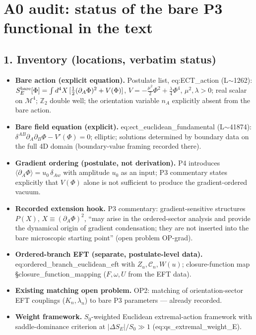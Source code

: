 \section*{A0 audit: status of the bare P3 functional in the text}

\subsection*{1. Inventory (locations, verbatim status)}
\begin{itemize}
\item \textbf{Bare action (explicit equation).}
  Postulate list, eq:ECT\_action (L$\sim$1262):
  $S_E^{\rm bare}[\Phi]=\int d^4X\,[\tfrac12(\partial_A\Phi)^2
  +V(\Phi)]$, $V=-\tfrac{\mu^2}{2}\Phi^2+\tfrac{\lambda}{4}\Phi^4$,
  $\mu^2,\lambda>0$; real scalar on $\mathcal M^4$; $\mathbb Z_2$
  double well; the orientation variable $n_A$ explicitly absent
  from the bare action.
\item \textbf{Bare field equation (explicit).}
  eq:ect\_euclidean\_fundamental (L$\sim$41874):
  $\delta^{AB}\partial_A\partial_B\Phi-V'(\Phi)=0$; elliptic;
  solutions determined by boundary data on the full 4D domain
  (boundary-value framing recorded there).
\item \textbf{Gradient ordering (postulate, not derivation).}
  P4 introduces $\langle\partial_A\Phi\rangle=u_0\,\delta_{Aw}$ with
  amplitude $u_0$ as an input; P3 commentary states explicitly that
  $V(\Phi)$ alone is not sufficient to produce the gradient-ordered
  vacuum.
\item \textbf{Recorded extension hook.}
  P3 commentary: gradient-sensitive structures $P(X)$,
  $X\equiv(\partial_A\Phi)^2$, ``may arise in the ordered-sector
  analysis and provide the dynamical origin of gradient
  condensation; they are not inserted into the bare microscopic
  starting point'' (open problem OP-grad).
\item \textbf{Ordered-branch EFT (separate, postulate-level data).}
  eq:ordered\_branch\_euclidean\_eft with $Z_u,\mathcal C_n,W(u)$;
  closure-function map \S closure\_function\_mapping
  ($F,\omega,U$ from the EFT data).
\item \textbf{Existing matching open problem.}
  OP2: matching of orientation-sector EFT couplings
  ($K_n,\lambda_n$) to bare P3 parameters --- already recorded.
\item \textbf{Weight framework.}
  $S_0$-weighted Euclidean extremal-action framework with
  saddle-dominance criterion at $|\Delta S_E|/S_0\gg1$
  (eq:qs\_extremal\_weight\_E).
\end{itemize}

